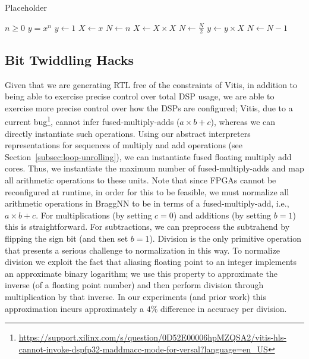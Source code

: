 \begin{algorithm}
	\caption{Placeholder}\label{alg:toposort}
	\begin{algorithmic}
		\Require $n \geq 0$
		\Ensure $y = x^n$
		\State $y \gets 1$
		\State $X \gets x$
		\State $N \gets n$
		\State $X \gets X \times X$
		\State $N \gets \frac{N}{2}$  
		\State $y \gets y \times X$
		\State $N \gets N - 1$
		\EndIf
		\EndWhile
	\end{algorithmic}
\end{algorithm}

\subsection{Bit Twiddling Hacks}\label{subsec:bit-twiddling-hacks}

Given that we are generating RTL free of the constraints of Vitis, in addition to being able to exercise precise control over total DSP usage, we are able to exercise more precise control over how the DSPs are configured;
Vitis, due to a current bug\footnote{\url{https://support.xilinx.com/s/question/0D52E00006hpMZQSA2/vitis-hls-cannot-invoke-dspfp32-maddmacc-mode-for-versal?language=en_US}}, cannot infer fused-multiply-adds ($a \times b + c$), whereas we can directly instantiate such operations.
Using our abstract interpreters representations for sequences of multiply and add operations (see Section~\ref{subsec:loop-unrolling}), we can instantiate fused floating multiply add cores.
Thus, we instantiate the maximum number of fused-multiply-adds and map all arithmetic operations to these units.
Note that since FPGAs cannot be reconfigured at runtime\cite{reconfigfpga}, in order for this to be feasible, we must normalize all arithmetic operations in BraggNN to be in terms of a fused-multiply-add, i.e., $a \times b + c$.
For multiplications (by setting $c = 0$) and additions (by setting $b = 1$) this is straightforward.
For subtractions, we can preprocess the subtrahend by flipping the sign bit (and then set $b = 1$).
Division is the only primitive operation that presents a serious challenge to normalization in this way.
To normalize division we exploit the fact that aliasing floating point to an integer implements an approximate binary logarithm\cite{enwiki:1081681080};
we use this property to approximate the inverse (of a floating point number) and then perform division through multiplication by that inverse.
In our experiments (and prior work\cite{10.1007/978-0-387-72258-0_14}) this approximation incurs approximately a $4\%$ difference in accuracy per division.

